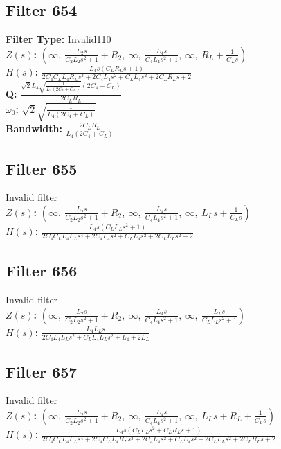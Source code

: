 \documentclass{article}
\begin{document}
\subsection*{Filter 654}
\textbf{Filter Type:} Invalid110 \\ 
\textbf{$Z(s)$:} $\left( \infty, \  \frac{L_{2} s}{C_{2} L_{2} s^{2} + 1} + R_{2}, \  \infty, \  \frac{L_{4} s}{C_{4} L_{4} s^{2} + 1}, \  \infty, \  R_{L} + \frac{1}{C_{L} s}\right)$ \\ 
\textbf{$H(s)$:} $\frac{L_{4} s \left(C_{L} R_{L} s + 1\right)}{2 C_{4} C_{L} L_{4} R_{L} s^{3} + 2 C_{4} L_{4} s^{2} + C_{L} L_{4} s^{2} + 2 C_{L} R_{L} s + 2}$ \\ 
\textbf{Q:} $\frac{\sqrt{2} L_{4} \sqrt{\frac{1}{L_{4} \left(2 C_{4} + C_{L}\right)}} \left(2 C_{4} + C_{L}\right)}{2 C_{L} R_{L}}$ \\ 
\textbf{$\omega_0$:} $\sqrt{2} \sqrt{\frac{1}{L_{4} \left(2 C_{4} + C_{L}\right)}}$ \\ 
\textbf{Bandwidth:} $\frac{2 C_{L} R_{L}}{L_{4} \left(2 C_{4} + C_{L}\right)}$ \\ 
\subsection*{Filter 655}
Invalid filter \\ 
\textbf{$Z(s)$:} $\left( \infty, \  \frac{L_{2} s}{C_{2} L_{2} s^{2} + 1} + R_{2}, \  \infty, \  \frac{L_{4} s}{C_{4} L_{4} s^{2} + 1}, \  \infty, \  L_{L} s + \frac{1}{C_{L} s}\right)$ \\ 
\textbf{$H(s)$:} $\frac{L_{4} s \left(C_{L} L_{L} s^{2} + 1\right)}{2 C_{4} C_{L} L_{4} L_{L} s^{4} + 2 C_{4} L_{4} s^{2} + C_{L} L_{4} s^{2} + 2 C_{L} L_{L} s^{2} + 2}$ \\ 
\subsection*{Filter 656}
Invalid filter \\ 
\textbf{$Z(s)$:} $\left( \infty, \  \frac{L_{2} s}{C_{2} L_{2} s^{2} + 1} + R_{2}, \  \infty, \  \frac{L_{4} s}{C_{4} L_{4} s^{2} + 1}, \  \infty, \  \frac{L_{L} s}{C_{L} L_{L} s^{2} + 1}\right)$ \\ 
\textbf{$H(s)$:} $\frac{L_{4} L_{L} s}{2 C_{4} L_{4} L_{L} s^{2} + C_{L} L_{4} L_{L} s^{2} + L_{4} + 2 L_{L}}$ \\ 
\subsection*{Filter 657}
Invalid filter \\ 
\textbf{$Z(s)$:} $\left( \infty, \  \frac{L_{2} s}{C_{2} L_{2} s^{2} + 1} + R_{2}, \  \infty, \  \frac{L_{4} s}{C_{4} L_{4} s^{2} + 1}, \  \infty, \  L_{L} s + R_{L} + \frac{1}{C_{L} s}\right)$ \\ 
\textbf{$H(s)$:} $\frac{L_{4} s \left(C_{L} L_{L} s^{2} + C_{L} R_{L} s + 1\right)}{2 C_{4} C_{L} L_{4} L_{L} s^{4} + 2 C_{4} C_{L} L_{4} R_{L} s^{3} + 2 C_{4} L_{4} s^{2} + C_{L} L_{4} s^{2} + 2 C_{L} L_{L} s^{2} + 2 C_{L} R_{L} s + 2}$ \\ 
\end{document}
